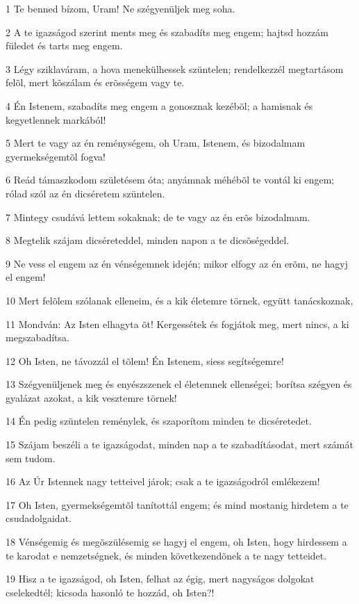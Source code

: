 \par 1 Te benned bízom, Uram! Ne szégyenüljek meg soha.
\par 2 A te igazságod szerint ments meg és szabadíts meg engem; hajtsd hozzám füledet és tarts meg engem.
\par 3 Légy sziklaváram, a hova menekülhessek szüntelen; rendelkezzél megtartásom felõl, mert kõszálam és erõsségem vagy te.
\par 4 Én Istenem, szabadíts meg engem a gonosznak kezébõl; a hamisnak és kegyetlennek markából!
\par 5 Mert te vagy az én reménységem, oh Uram, Istenem, és bizodalmam gyermekségemtõl fogva!
\par 6 Reád támaszkodom születésem óta; anyámnak méhébõl te vontál ki engem; rólad szól az én dicséretem szüntelen.
\par 7 Mintegy csudává lettem sokaknak; de te vagy az én erõs bizodalmam.
\par 8 Megtelik szájam dicséreteddel, minden napon a te dicsõségeddel.
\par 9 Ne vess el engem az én vénségemnek idején; mikor elfogy az én erõm, ne hagyj el engem!
\par 10 Mert felõlem szólanak elleneim, és a kik életemre törnek, együtt tanácskoznak,
\par 11 Mondván: Az Isten elhagyta õt! Kergessétek és fogjátok meg, mert nincs, a ki megszabadítsa.
\par 12 Oh Isten, ne távozzál el tõlem! Én Istenem, siess segítségemre!
\par 13 Szégyenüljenek meg és enyészszenek el életemnek ellenségei; borítsa szégyen és gyalázat azokat, a kik vesztemre törnek!
\par 14 Én pedig szüntelen reménylek, és szaporítom minden te dicséretedet.
\par 15 Szájam beszéli a te igazságodat, minden nap a te szabadításodat, mert számát sem tudom.
\par 16 Az Úr Istennek nagy tetteivel járok; csak a te igazságodról emlékezem!
\par 17 Oh Isten, gyermekségemtõl tanítottál engem; és mind mostanig hirdetem a te csudadolgaidat.
\par 18 Vénségemig és megõszülésemig se hagyj el engem, oh Isten, hogy hirdessem a te karodat e nemzetségnek, és minden következendõnek a te nagy tetteidet.
\par 19 Hisz a te igazságod, oh Isten, felhat az égig, mert nagyságos dolgokat cselekedtél; kicsoda hasonló te hozzád, oh Isten?!
